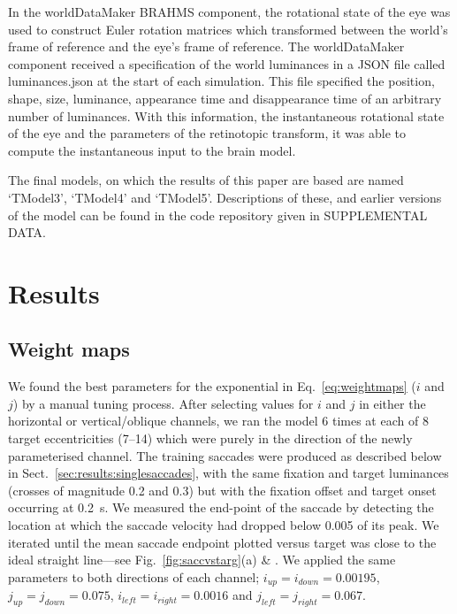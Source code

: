 \documentclass{frontiersSCNS}
\begin{document}
In the worldDataMaker BRAHMS component, the rotational state of the
eye was used to construct Euler rotation matrices which transformed
between the world's frame of reference and the eye's frame of
reference. The worldDataMaker component received a specification of
the world luminances in a JSON file called luminances.json at the
start of each simulation. This file specified the position,
shape, size, luminance, appearance time and disappearance time of an
arbitrary number of luminances. With this information, the
instantaneous rotational state of the eye and the parameters of the
retinotopic transform, it was able to compute the instantaneous input
to the brain model.

The final models, on which the results of this paper are based are
named `TModel3', `TModel4' and `TModel5'. Descriptions of these, and
earlier versions of the model can be found in the code repository
given in SUPPLEMENTAL DATA.


\section{Results} \label{sec:results}

\subsection{Weight maps} \label{sec:results:weightmaps}

We found the best parameters for the exponential in
Eq.~\ref{eq:weightmaps} ($i$ and $j$) by a manual tuning
process. After selecting values for $i$ and $j$ in either the
horizontal or vertical/oblique channels, we ran the model 6 times at
each of 8 target eccentricities (7\dg--14\dg) which were purely in the
direction of the newly parameterised channel. The training saccades
were produced as described below in Sect.~\ref{sec:results:singlesaccades},
with the same fixation and target luminances (crosses of magnitude 0.2
and 0.3) but with the fixation offset and target onset occurring at
0.2~s. We measured the end-point of the saccade by detecting the
location at which the saccade velocity had dropped below 0.005 of its
peak. We iterated until the mean saccade endpoint plotted versus
target was close to the ideal straight line---see
Fig.~\ref{fig:saccvstarg}(a) \& . We applied the same parameters to
both directions of each channel; $i_{up} = i_{down} = 0.00195$,
$j_{up} = j_{down} = 0.075$, $i_{left} = i_{right} = 0.0016$ and
$j_{left} = j_{right} = 0.067$.
\end{document}
